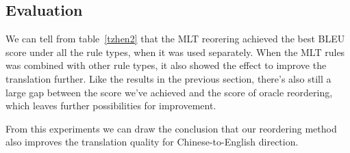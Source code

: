 \subsection{Evaluation}

We can tell from table~\ref{tzhen2} that the MLT reorering achieved the best BLEU score under all the rule types, when it was used separately. When the MLT rules was combined with other rule types, it also showed the effect to improve the translation further. Like the results in the previous section, there's also still a large gap between the score we've achieved and the score of oracle reordering, which leaves further possibilities for improvement.%

From this experiments we can draw the conclusion that our reordering method also improves the translation quality for Chinese-to-English direction.


%
%
%
%
%
%
%

